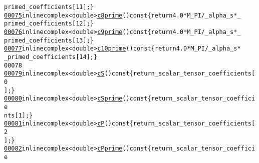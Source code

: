 \begin{footnotesize}
\begin{alltt}
      primed\_coefficients[11]; \}
\hypertarget{wilson__coefficients_8hh_source_l00075}{}\hyperlink{structeos_1_1WilsonCoefficients_3_01BToS_01_4_abfc2ac642a0fd10464d843eb7ed8ebab}{00075}         \textcolor{keyword}{inline} complex<double> \hyperlink{structeos_1_1WilsonCoefficients_3_01BToS_01_4_abfc2ac642a0fd10464d843eb7ed8ebab}{c8prime}()\textcolor{keyword}{ const }\{ \textcolor{keywordflow}{return} 4.0 * M\_PI / \_alpha\_s * \_
      primed\_coefficients[12]; \}
\hypertarget{wilson__coefficients_8hh_source_l00076}{}\hyperlink{structeos_1_1WilsonCoefficients_3_01BToS_01_4_a633c2ff746cf0998286b396d5d6ad864}{00076}         \textcolor{keyword}{inline} complex<double> \hyperlink{structeos_1_1WilsonCoefficients_3_01BToS_01_4_a633c2ff746cf0998286b396d5d6ad864}{c9prime}()\textcolor{keyword}{ const }\{ \textcolor{keywordflow}{return} 4.0 * M\_PI / \_alpha\_s * \_
      primed\_coefficients[13]; \}
\hypertarget{wilson__coefficients_8hh_source_l00077}{}\hyperlink{structeos_1_1WilsonCoefficients_3_01BToS_01_4_a5afdd05acb7cd08196aa402ed6ccd374}{00077}         \textcolor{keyword}{inline} complex<double> \hyperlink{structeos_1_1WilsonCoefficients_3_01BToS_01_4_a5afdd05acb7cd08196aa402ed6ccd374}{c10prime}()\textcolor{keyword}{ const }\{ \textcolor{keywordflow}{return} 4.0 * M\_PI / \_alpha\_s * 
      \_primed\_coefficients[14]; \}
00078 
\hypertarget{wilson__coefficients_8hh_source_l00079}{}\hyperlink{structeos_1_1WilsonCoefficients_3_01BToS_01_4_afb6218a0c941a2c158753e8977ceca2a}{00079}         \textcolor{keyword}{inline} complex<double> \hyperlink{structeos_1_1WilsonCoefficients_3_01BToS_01_4_afb6218a0c941a2c158753e8977ceca2a}{cS}()\textcolor{keyword}{ const }\{ \textcolor{keywordflow}{return}  \_scalar\_tensor\_coefficients[0
      ]; \}
\hypertarget{wilson__coefficients_8hh_source_l00080}{}\hyperlink{structeos_1_1WilsonCoefficients_3_01BToS_01_4_afee3b55a164362636ff1bdfcea0d869f}{00080}         \textcolor{keyword}{inline} complex<double> \hyperlink{structeos_1_1WilsonCoefficients_3_01BToS_01_4_afee3b55a164362636ff1bdfcea0d869f}{cSprime}()\textcolor{keyword}{ const }\{ \textcolor{keywordflow}{return}  \_scalar\_tensor\_coefficie
      nts[1]; \}
\hypertarget{wilson__coefficients_8hh_source_l00081}{}\hyperlink{structeos_1_1WilsonCoefficients_3_01BToS_01_4_af5e99da02e53255077cdf53b315c0960}{00081}         \textcolor{keyword}{inline} complex<double> \hyperlink{structeos_1_1WilsonCoefficients_3_01BToS_01_4_af5e99da02e53255077cdf53b315c0960}{cP}()\textcolor{keyword}{ const }\{ \textcolor{keywordflow}{return}  \_scalar\_tensor\_coefficients[2
      ]; \}
\hypertarget{wilson__coefficients_8hh_source_l00082}{}\hyperlink{structeos_1_1WilsonCoefficients_3_01BToS_01_4_ab49d57e926919ae28d0780f8d9df644b}{00082}         \textcolor{keyword}{inline} complex<double> \hyperlink{structeos_1_1WilsonCoefficients_3_01BToS_01_4_ab49d57e926919ae28d0780f8d9df644b}{cPprime}()\textcolor{keyword}{ const }\{ \textcolor{keywordflow}{return}  \_scalar\_tensor\_coefficie

\end{alltt}
\end{footnotesize}
